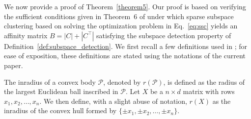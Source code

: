 \documentclass[12pt]{article}
\begin{document}

We now provide a proof of Theorem~\ref{theorem5}. Our proof is based
on verifying the sufficient conditions given in Theorem~6 of
\cite{jmlr-v28-wang13}
under which sparse subspace clustering based on solving the
optimization problem in Eq.~\eqref{eq:ssc} yields an affinity matrix
$B = |C| + |C^{\top}|$ satisfying the subspace detection property of
Definition~\ref{def:subspace_detection}. We first recall a few
definitions used in \cite{jmlr-v28-wang13}; for ease of exposition,
these definitions are stated using the notations of the current paper. 

\begin{definition}
  \label{inradius}
The inradius of a convex body $\mathcal{P}$, denoted by $r(\mathcal{P})$, is
defined as the radius of the largest Euclidean ball inscribed in $\mathcal{P}$.
Let $X$ be a $n \times d$ matrix with rows $x_1, x_2, \dots,
x_n$. We then define, with a slight abuse of notation, $r(X)$ as the
inradius of the convex hull formed by $\{\pm x_1, \pm x_2, \dots, \pm x_n\}$. 
\end{definition}
\end{document}
